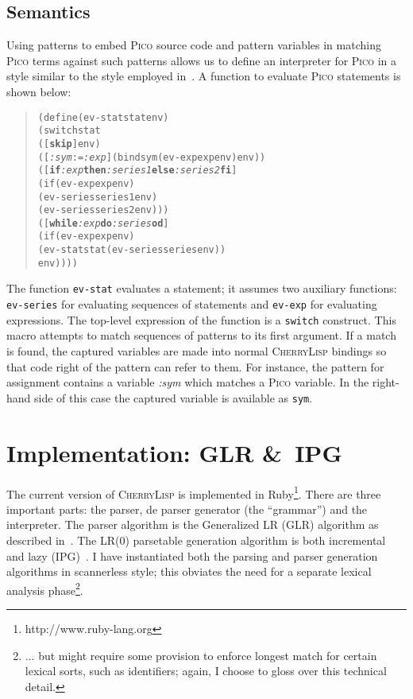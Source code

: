 \documentclass[a4paper]{llncs}
\def\pico{\textsc{Pico}\xspace}
\def\cherrylisp{\textsc{CherryLisp}\xspace}
\def\mytextbf#1{\textrm{\textbf{#1}}}
\def\mytextit#1{\textrm{\textit{#1}}}
\def\Skip{\mytextbf{skip}}
\def\If{\mytextbf{if}}
\def\Then{\mytextbf{then}}
\def\Else{\mytextbf{else}}
\def\Fi{\mytextbf{fi}}
\def\While{\mytextbf{while}}
\def\Do{\mytextbf{do}}
\def\Od{\mytextbf{od}}
\def\Var#1{\mytextit{#1}}
\begin{document}
\subsection{Semantics}

Using patterns to embed \pico source code and pattern variables in
matching \pico terms against such patterns allows us to define an
interpreter for \pico in a style similar to the style employed
in~\cite{BHK89,PicoReport}. A function to evaluate \pico statements
is shown below:
\begin{quote}
\begin{alltt}
(define (ev-stat stat env)
  (switch stat
    ([\Skip] env)
    ([\Var{:sym} := \Var{:exp}] (bind sym (ev-exp exp env) env))
    ([\If \Var{:exp} \Then \Var{:series1} \Else \Var{:series2} \Fi]
     (if (ev-exp exp env) 
        (ev-series series1 env)
        (ev-series series2 env)))
    ([\While \Var{:exp} \Do \Var{:series} \Od]
     (if (ev-exp exp env) 
       (ev-stat stat (ev-series series env))
       env)))) 
\end{alltt}
\end{quote}
The function \texttt{ev-stat} evaluates a statement; it assumes two
auxiliary functions: \texttt{ev-series} for evaluating sequences of
statements and \texttt{ev-exp} for evaluating expressions. The
top-level expression of the function is a \texttt{switch} construct.
This macro attempts to match sequences of patterns to its first
argument. If a match is found, the captured variables are made into
normal \cherrylisp bindings so that code right of the pattern can
refer to them. For instance, the pattern for assignment contains a
variable \Var{:sym} which matches a \pico variable. In the right-hand
side of this case the captured variable is available as \texttt{sym}.


\section{Implementation: GLR \&\  IPG}

The current version of \cherrylisp is implemented in
Ruby\footnote{http://www.ruby-lang.org}. There are three important
parts: the parser, de parser generator (the ``grammar'') and the
interpreter.  The parser algorithm is the Generalized LR (GLR)
algorithm as described in~\cite{RekersThesis}. The LR(0) parsetable
generation algorithm is both incremental and lazy
(IPG)~\cite{RekersThesis, IncrementalParserGeneration}. I have
instantiated both the parsing and parser generation algorithms in
scannerless style; this obviates the need for a separate lexical
analysis phase\footnote{... but might require some provision to
  enforce longest match for certain lexical sorts, such as
  identifiers; again, I choose to gloss over this technical detail.}.
\end{document}

